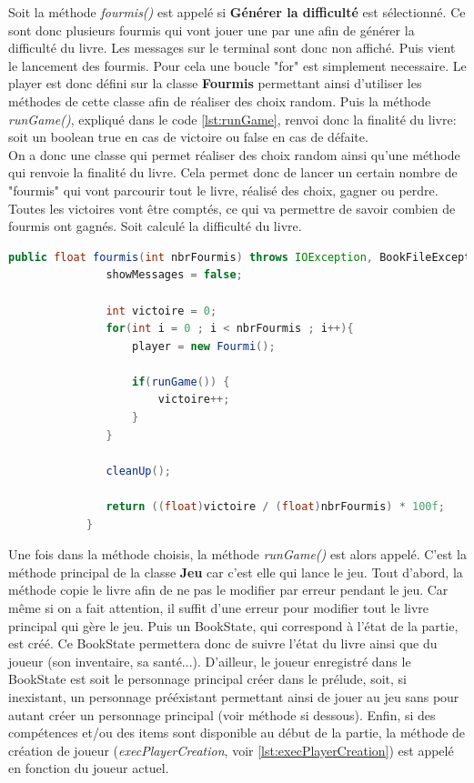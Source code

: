 		Soit la méthode \textit{fourmis()} est appelé si \textbf{Générer la difficulté} est sélectionné. Ce sont donc plusieurs fourmis qui vont jouer une par une afin de générer la difficulté du livre. Les messages sur le terminal sont donc non affiché. Puis vient le lancement des fourmis. Pour cela une boucle "for" est simplement necessaire. Le player est donc défini sur la classe \textbf{Fourmis} permettant ainsi d'utiliser les méthodes de cette classe afin de réaliser des choix random. Puis la méthode \textit{runGame()}, expliqué dans le code \ref{lst:runGame}, renvoi donc la finalité du livre: soit un boolean true en cas de victoire ou false en cas de défaite.\\
		On a donc une classe qui permet réaliser des choix random ainsi qu'une méthode qui renvoie la finalité du livre. Cela permet donc de lancer un certain nombre de "fourmis" qui vont parcourir tout le livre, réalisé des choix, gagner ou perdre. Toutes les victoires vont être comptés, ce qui va permettre de savoir combien de fourmis ont gagnés. Soit calculé la difficulté du livre.

		\begin{lstlisting}[gobble=12, language=java, caption=fourmis()]
			public float fourmis(int nbrFourmis) throws IOException, BookFileException {
			   showMessages = false;

			   int victoire = 0;
			   for(int i = 0 ; i < nbrFourmis ; i++){
				   player = new Fourmi();

				   if(runGame()) {
					   victoire++;
				   }
			   }

			   cleanUp();

			   return ((float)victoire / (float)nbrFourmis) * 100f;
			}
		\end{lstlisting}

		Une fois dans la méthode choisis, la méthode \textit{runGame()} est alors appelé. C'est la méthode principal de la classe \textbf{Jeu} car c'est elle qui lance le jeu.
		Tout d'abord, la méthode copie le livre afin de ne pas le modifier par erreur pendant le jeu. Car même si on a fait attention, il suffit d'une erreur pour modifier tout le livre principal qui gère le jeu. Puis un BookState, qui correspond à l'état de la partie, est créé. Ce BookState permettera donc de suivre l'état du livre ainsi que du joueur (son inventaire, sa santé...). D'ailleur, le joueur enregistré dans le BookState est soit le personnage principal créer dans le prélude, soit, si inexistant, un personnage prééxistant permettant ainsi de jouer au jeu sans pour autant créer un personnage principal (voir méthode si dessous). Enfin, si des compétences et/ou des items sont disponible au début de la partie, la méthode de création de joueur (\textit{execPlayerCreation}, voir \ref{lst:execPlayerCreation}) est appelé en fonction du joueur actuel.

